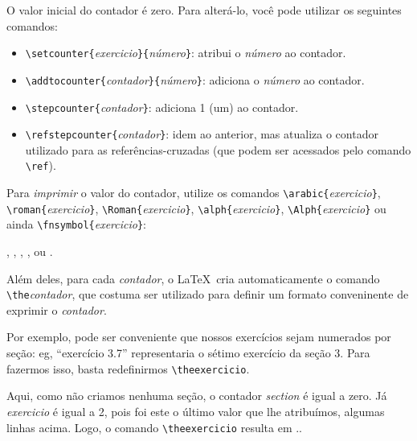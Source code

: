 \documentclass[a4paper,12pt]{article}
\newcommand{\contador}[1]{\textit{#1}}
\begin{document}
	O valor inicial do contador é zero. Para alterá-lo, você pode utilizar os
	seguintes comandos:
	\begin{itemize}
		\item
		\verb|\setcounter{|\contador{exercicio}\verb|}{|\textit{número}\verb|}|:
		atribui o \textit{número} ao contador.
		
		\item
		\verb|\addtocounter{|\textit{contador}\verb|}{|\textit{número}\verb|}|:
		adiciona o \textit{número} ao contador.
					
		\item
		\verb|\stepcounter{|\textit{contador}\verb|}|:
		adiciona 1 (um) ao contador.
					
		\item	\verb|\refstepcounter{|\textit{contador}\verb|}|:		
		idem ao anterior, mas atualiza o contador utilizado para as
		referências-cruzadas (que podem ser acessados pelo comando \verb|\ref|).
		
	\end{itemize}	
		
	Para \emph{imprimir} o valor do contador, utilize os comandos 
		\verb|\arabic{|\contador{exercicio}\verb|}|,
		\verb|\roman{|\contador{exercicio}\verb|}|,
		\verb|\Roman{|\contador{exercicio}\verb|}|,
		\verb|\alph{|\contador{exercicio}\verb|}|,
		\verb|\Alph{|\contador{exercicio}\verb|}| ou ainda
		\verb|\fnsymbol{|\contador{exercicio}\verb|}|:
	
	\setcounter{exercicio}{2}
	
	\begin{center}
		,
		,
		,
		,
		 ou
		.
	\end{center}
	
	Além deles, para cada \contador{contador}, o \LaTeX\ cria automaticamente o
	comando \verb|\the|\contador{contador}, que costuma ser utilizado para 
	definir um formato conveninente de exprimir o \contador{contador}.
	
	Por exemplo, pode ser conveniente que nossos exercícios sejam numerados por
	seção: eg, ``exercício 3.7'' representaria o sétimo exercício da seção 3.
	Para fazermos isso, basta redefinirmos \verb|\theexercicio|.
	
	\renewcommand{\theexercicio}{\arabic{section}.\arabic{exercicio}}
	
	Aqui, como não criamos nenhuma seção, o contador \contador{section} é igual a
	zero. Já \contador{exercicio} é igual a 2, pois foi este o último valor que
	lhe atribuímos, algumas linhas acima. Logo, o comando \verb|\theexercicio|
	resulta em \theexercicio.
	
\end{document}
